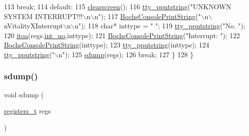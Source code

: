\begin{DoxyCode}
113             \textcolor{keywordflow}{break};
114         \textcolor{keywordflow}{default}:
115             \hyperlink{a00140_aff4bc17c602603d120756f52e18ebb96_aff4bc17c602603d120756f52e18ebb96}{clearscreen}();
116             \hyperlink{a00140_ade960b1320324706aac6c00cc6b1b2fe_ade960b1320324706aac6c00cc6b1b2fe}{tty\_pputstring}(\textcolor{stringliteral}{"UNKNOWN SYSTEM INTERRUPT!!!\(\backslash\)n\(\backslash\)n"});
117             \hyperlink{a00056_a19e1f554d03c977f8b947f21489daa41_a19e1f554d03c977f8b947f21489daa41}{BochsConsolePrintString}(\textcolor{stringliteral}{"\(\backslash\)n\(\backslash\)nVitalityXInterrupt\(\backslash\)n\(\backslash\)n"});
118             \textcolor{keywordtype}{char}* inttype = \textcolor{stringliteral}{"  "};
119             \hyperlink{a00140_ade960b1320324706aac6c00cc6b1b2fe_ade960b1320324706aac6c00cc6b1b2fe}{tty\_pputstring}(\textcolor{stringliteral}{"No. "});
120             \hyperlink{a00104_af749add1ff19b6ff96a62f35ebb49b7e_af749add1ff19b6ff96a62f35ebb49b7e}{itoa}(regs.\hyperlink{a00202_af311750a9b18afb3b1ed2d144fbe1cb0_af311750a9b18afb3b1ed2d144fbe1cb0}{int\_no},inttype);
121             \hyperlink{a00056_a19e1f554d03c977f8b947f21489daa41_a19e1f554d03c977f8b947f21489daa41}{BochsConsolePrintString}(\textcolor{stringliteral}{"Interrupt: "});
122             \hyperlink{a00056_a19e1f554d03c977f8b947f21489daa41_a19e1f554d03c977f8b947f21489daa41}{BochsConsolePrintString}(inttype);
123             \hyperlink{a00140_ade960b1320324706aac6c00cc6b1b2fe_ade960b1320324706aac6c00cc6b1b2fe}{tty\_pputstring}(inttype);
124             \hyperlink{a00140_ade960b1320324706aac6c00cc6b1b2fe_ade960b1320324706aac6c00cc6b1b2fe}{tty\_pputstring}(\textcolor{stringliteral}{"\(\backslash\)n"});
125             \hyperlink{a00092_a4b4233daef6e041e7278cae2b21b5ed4_a4b4233daef6e041e7278cae2b21b5ed4}{sdump}(regs);
126             \textcolor{keywordflow}{break};
127     \}
128 \}
\end{DoxyCode}
\mbox{\label{a00092_a4b4233daef6e041e7278cae2b21b5ed4_a4b4233daef6e041e7278cae2b21b5ed4}} 
\subsubsection{\texorpdfstring{sdump()}{sdump()}}
{\footnotesize\ttfamily void sdump (\begin{DoxyParamCaption}\item[{\hyperlink{a00095_adf58dbaf6139b4957c348711f2026957_adf58dbaf6139b4957c348711f2026957}{registers\+\_\+t}}]{regs }\end{DoxyParamCaption})}



